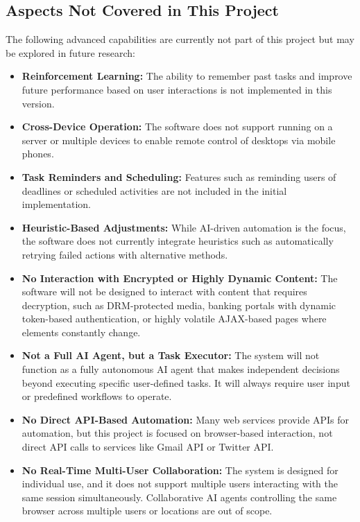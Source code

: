 \documentclass[conference]{IEEEtran}
\begin{document}
\subsection{Aspects Not Covered in This Project}
The following advanced capabilities are currently not part of this project but may be explored in future research:
\begin{itemize}
    \item \textbf{Reinforcement Learning:} The ability to remember past tasks and improve future performance based on user interactions is not implemented in this version.

    \item \textbf{Cross-Device Operation:} The software does not support running on a server or multiple devices to enable remote control of desktops via mobile phones.

    \item \textbf{Task Reminders and Scheduling:} Features such as reminding users of deadlines or scheduled activities are not included in the initial implementation.

    \item \textbf{Heuristic-Based Adjustments:} While AI-driven automation is the focus, the software does not currently integrate heuristics such as automatically retrying failed actions with alternative methods.

    \item \textbf{No Interaction with Encrypted or Highly Dynamic Content:}
          The software will not be designed to interact with content that requires decryption, such as DRM-protected media, banking portals with dynamic token-based authentication, or highly volatile AJAX-based pages where elements constantly change.

    \item \textbf{Not a Full AI Agent, but a Task Executor:}
          The system will not function as a fully autonomous AI agent that makes independent decisions beyond executing specific user-defined tasks. It will always require user input or predefined workflows to operate.

    \item \textbf{No Direct API-Based Automation:}
          Many web services provide APIs for automation, but this project is focused on browser-based interaction, not direct API calls to services like Gmail API or Twitter API.

    \item \textbf{No Real-Time Multi-User Collaboration:}
          The system is designed for individual use, and it does not support multiple users interacting with the same session simultaneously. Collaborative AI agents controlling the same browser across multiple users or locations are out of scope.


\end{itemize}
\end{document}
